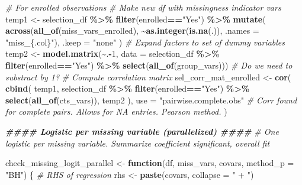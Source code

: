 \documentclass[
]{article}
\newenvironment{Shaded}{\begin{snugshade}}{\end{snugshade}}
\newcommand{\AttributeTok}[1]{\textcolor[rgb]{0.13,0.29,0.53}{#1}}
\newcommand{\CommentTok}[1]{\textcolor[rgb]{0.56,0.35,0.01}{\textit{#1}}}
\newcommand{\ControlFlowTok}[1]{\textcolor[rgb]{0.13,0.29,0.53}{\textbf{#1}}}
\newcommand{\DecValTok}[1]{\textcolor[rgb]{0.00,0.00,0.81}{#1}}
\newcommand{\DocumentationTok}[1]{\textcolor[rgb]{0.56,0.35,0.01}{\textbf{\textit{#1}}}}
\newcommand{\FunctionTok}[1]{\textcolor[rgb]{0.13,0.29,0.53}{\textbf{#1}}}
\newcommand{\NormalTok}[1]{#1}
\newcommand{\OtherTok}[1]{\textcolor[rgb]{0.56,0.35,0.01}{#1}}
\newcommand{\SpecialCharTok}[1]{\textcolor[rgb]{0.81,0.36,0.00}{\textbf{#1}}}
\newcommand{\StringTok}[1]{\textcolor[rgb]{0.31,0.60,0.02}{#1}}
\newcounter{none} %
\begin{document}
\begin{Shaded}
\begin{Highlighting}[]
\CommentTok{\# For enrolled observations}
\CommentTok{\# Make new df with missingness indicator vars}
\NormalTok{temp1 }\OtherTok{\textless{}{-}}\NormalTok{ selection\_df }\SpecialCharTok{\%\textgreater{}\%} 
  \FunctionTok{filter}\NormalTok{(enrolled}\SpecialCharTok{==}\StringTok{"Yes"}\NormalTok{) }\SpecialCharTok{\%\textgreater{}\%} 
  \FunctionTok{mutate}\NormalTok{(}
    \FunctionTok{across}\NormalTok{(}\FunctionTok{all\_of}\NormalTok{(miss\_vars\_enrolled), }
           \SpecialCharTok{\textasciitilde{}}\FunctionTok{as.integer}\NormalTok{(}\FunctionTok{is.na}\NormalTok{(.)),}
           \AttributeTok{.names =} \StringTok{"miss\_\{.col\}"}\NormalTok{),}
    \AttributeTok{.keep =} \StringTok{"none"}
\NormalTok{  )}
\CommentTok{\# Expand factors to set of dummy variables}
\NormalTok{temp2 }\OtherTok{\textless{}{-}} \FunctionTok{model.matrix}\NormalTok{(}\SpecialCharTok{\textasciitilde{}}\NormalTok{.}\SpecialCharTok{{-}}\DecValTok{1}\NormalTok{, }\AttributeTok{data =}\NormalTok{ selection\_df }\SpecialCharTok{\%\textgreater{}\%} \FunctionTok{filter}\NormalTok{(enrolled}\SpecialCharTok{==}\StringTok{"Yes"}\NormalTok{) }\SpecialCharTok{\%\textgreater{}\%} \FunctionTok{select}\NormalTok{(}\FunctionTok{all\_of}\NormalTok{(group\_vars))) }\CommentTok{\# Do we need to substract by 1?}
\CommentTok{\# Compute correlation matrix}
\NormalTok{sel\_corr\_mat\_enrolled }\OtherTok{\textless{}{-}} \FunctionTok{cor}\NormalTok{(}
  \FunctionTok{cbind}\NormalTok{(}
\NormalTok{    temp1, }
\NormalTok{    selection\_df }\SpecialCharTok{\%\textgreater{}\%} \FunctionTok{filter}\NormalTok{(enrolled}\SpecialCharTok{==}\StringTok{"Yes"}\NormalTok{) }\SpecialCharTok{\%\textgreater{}\%} \FunctionTok{select}\NormalTok{(}\FunctionTok{all\_of}\NormalTok{(cts\_vars)), }
\NormalTok{    temp2}
\NormalTok{    ),}
  \AttributeTok{use =} \StringTok{"pairwise.complete.obs"} \CommentTok{\# Corr found for complete pairs. Allows for NA entries. Pearson method.}
\NormalTok{)}




\DocumentationTok{\#\#\#\# Logistic per missing variable (parallelized) \#\#\#\#}
\CommentTok{\# One logistic per missing variable. Summarize coefficient significant, overall fit}

\NormalTok{check\_missing\_logit\_parallel }\OtherTok{\textless{}{-}} \ControlFlowTok{function}\NormalTok{(df, miss\_vars, covars, }\AttributeTok{method\_p =} \StringTok{"BH"}\NormalTok{) \{}
  \CommentTok{\# RHS of regression}
\NormalTok{  rhs }\OtherTok{\textless{}{-}} \FunctionTok{paste}\NormalTok{(covars, }\AttributeTok{collapse =} \StringTok{" + "}\NormalTok{) }
  

\end{Highlighting}
\end{Shaded}
\end{document}
